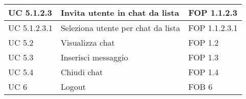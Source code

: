 \begin{longtable}{p{} p{} p{} }
\midrule
UC 5.1.2.3 & Invita utente in chat da lista & FOP 1.1.2.3\\
\midrule
UC 5.1.2.3.1 & Seleziona utente per chat da lista & FOP 1.1.2.3.1\\

\midrule
UC 5.2 & Visualizza chat & FOP 1.2\\

\midrule
UC 5.3 & Inserisci messaggio & FOP 1.3\\

\midrule
UC 5.4 & Chiudi chat & FOP 1.4\\


\midrule
UC 6 & Logout & FOB 6\\

\end{longtable}
\newpage


